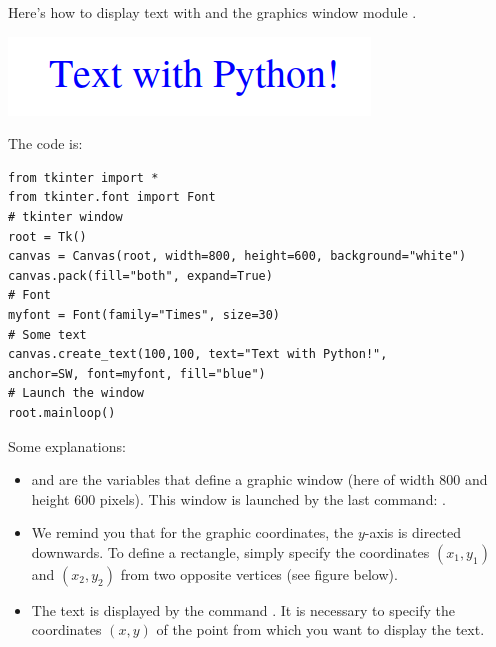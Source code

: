 \documentclass[11pt,class=report,crop=false]{standalone}
\begin{document}




\begin{cours}
Here's how to display text with \Python{} and the graphics window module 
.


\begin{center}
\includegraphics[scale=0.6]{screen-markdown-7-en}
\end{center}
The code is:
\begin{lstlisting}
from tkinter import *
from tkinter.font import Font
# tkinter window
root = Tk()  
canvas = Canvas(root, width=800, height=600, background="white")
canvas.pack(fill="both", expand=True)
# Font
myfont = Font(family="Times", size=30)
# Some text
canvas.create_text(100,100, text="Text with Python!", 
anchor=SW, font=myfont, fill="blue")
# Launch the window
root.mainloop()
\end{lstlisting}


Some explanations:
\begin{itemize}
  \item {} and  are the variables that define a graphic window (here of width $800$ and height $600$ pixels). This window is launched by the last command: .
  
  \item We remind you that for the graphic coordinates, the $y$-axis is directed downwards. To define a rectangle, simply specify the coordinates 
  $(x_1,y_1)$ and $(x_2,y_2)$ from two opposite vertices (see figure below). 
  
  \item The text is displayed by the command . It is necessary to specify the coordinates $(x,y)$ of the point from which you want to display the text. 
  

\end{itemize}
\end{cours}
\end{document}
